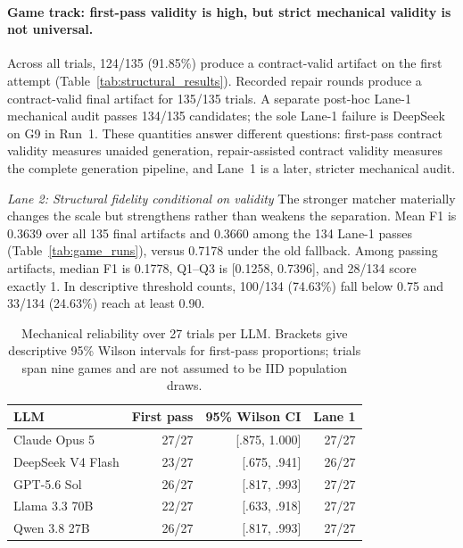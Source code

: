 \documentclass{article}
\begin{document}
\paragraph{Game track: first-pass validity is high, but strict mechanical validity is not universal.}
  Across all trials, 124/135 (91.85\%) produce a contract-valid artifact on the
  first attempt (Table~\ref{tab:structural_results}). Recorded repair rounds produce a
  contract-valid final artifact for 135/135 trials. A separate post-hoc Lane-1
  mechanical audit passes 134/135 candidates; the sole Lane-1 failure is
  DeepSeek on G9 in Run~1. These quantities answer different questions:
  first-pass contract validity measures unaided generation, repair-assisted
  contract validity measures the complete generation pipeline, and Lane~1 is a
  later, stricter mechanical audit.

\emph{Lane 2: Structural fidelity conditional on validity\quad}
The stronger matcher materially changes the scale but strengthens rather than weakens the separation. Mean F1 is 0.3639 over all 135 final artifacts and 0.3660 among the 134 Lane-1 passes (Table~\ref{tab:game_runs}), versus 0.7178 under the old fallback. Among passing artifacts, median F1 is 0.1778, Q1--Q3 is [0.1258, 0.7396], and 28/134 score exactly 1. In descriptive threshold counts, 100/134 (74.63\%) fall below 0.75 and 33/134 (24.63\%) reach at least 0.90.

\begin{table}[H]
\centering
\small
\caption{Mechanical reliability over 27 trials per LLM. Brackets give descriptive 95\% Wilson intervals for first-pass proportions; trials span nine games and are not assumed to be IID population draws.}
\label{tab:main_results}
\begin{tabular}{lrrr}
\toprule
LLM & First pass & 95\% Wilson CI & Lane 1 \\
\midrule
Claude Opus 5 & 27/27 & [.875, 1.000] & 27/27 \\
DeepSeek V4 Flash & 23/27 & [.675, .941] & 26/27 \\
GPT-5.6 Sol & 26/27 & [.817, .993] & 27/27 \\
Llama 3.3 70B & 22/27 & [.633, .918] & 27/27 \\
Qwen 3.8 27B & 26/27 & [.817, .993] & 27/27 \\
\bottomrule
\end{tabular}
\end{table}
\end{document}

